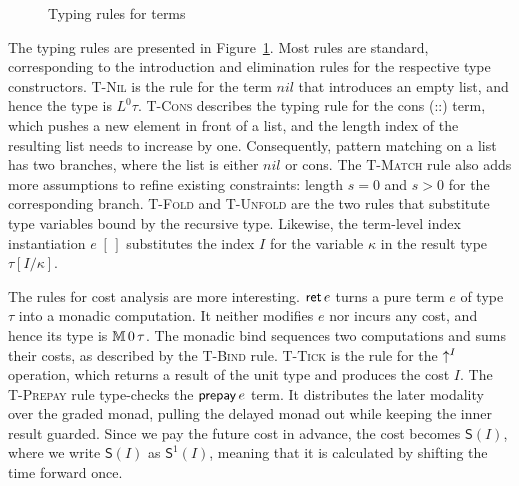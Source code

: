\begin{figure}[!htbp]
\caption{Typing rules for terms}
\label{def:worst-case-typing-judgment}
\end{figure}

The typing rules are presented in Figure~\ref{def:worst-case-typing-judgment}. Most rules are standard, corresponding to the introduction and elimination rules for the respective type constructors.
\textsc{T-Nil} is the rule for the term $nil$ that introduces an empty list, and hence the type is $L^0 \tau$.
\textsc{T-Cons} describes the typing rule for the cons (::) term, which pushes a new element in front of a list, and the length index of the resulting list 
needs to increase by one. Consequently, pattern matching on a list has two branches, where the list is either $nil$ or cons.
The \textsc{T-Match} rule also adds more assumptions to refine existing constraints: length $s = 0$ and $s > 0$ for the corresponding branch.
\textsc{T-Fold} and \textsc{T-Unfold} are the two rules that substitute type variables bound by the recursive type.
Likewise, the term-level index instantiation $e\;[\,]$ substitutes the index $I$ for the variable $\kappa$ in the result type $\tau [I/\kappa]$.

The rules for cost analysis are more interesting. $\mathsf{ret}\, e$ turns a pure term $e$ of type $\tau$ into a monadic computation.
It neither modifies $e$ nor incurs any cost, and hence its type is $\mathbb{M}\,{0}\, \tau$. 
The monadic bind sequences two computations and sums their costs, as described by the \textsc{T-Bind} rule.
\textsc{T-Tick} is the rule for the $\uparrow^{I}$ operation, which returns a result of the unit type and produces the cost $I$.
The \textsc{T-Prepay} rule type-checks the $\mathsf{prepay}\, e$ term. It distributes the later modality over the graded monad, pulling the 
delayed monad out while keeping the inner result guarded. Since we pay the future cost in advance, 
the cost becomes $\mathsf{S}(I)$, where we write $\mathsf{S}(I)$ as $\mathsf{S}^1(I)$, meaning that it is calculated by shifting the time forward once.

